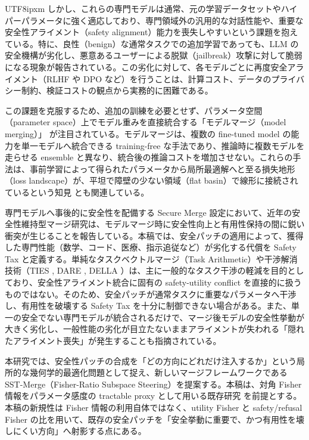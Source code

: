 \documentclass[letterpaper]{article} %
\begin{document}
\begin{CJK*}{UTF8}{ipxm}
しかし、これらの専門モデルは通常、元の学習データセットやハイパーパラメータに強く適応しており、専門領域外の汎用的な対話性能や、重要な安全性アライメント（safety alignment）能力を喪失しやすいという課題を抱えている。特に、良性（benign）な通常タスクでの追加学習であっても、LLM の安全機構が劣化し、悪意あるユーザーによる脱獄（jailbreak）攻撃に対して脆弱になる現象が報告されている\citep{zou2023universal, wei2024jailbroken, huang2024trustllm}。この劣化に対して、各モデルごとに再度安全アライメント（RLHF や DPO など）を行うことは、計算コスト、データのプライバシー制約、検証コストの観点から実務的に困難である。

この課題を克服するため、追加の訓練を必要とせず、パラメータ空間（parameter space）上でモデル重みを直接統合する「モデルマージ（model merging）」\citep{wortsman2022model, Ilharco2022EditingMW} が注目されている。モデルマージは、複数の fine-tuned model の能力を単一モデルへ統合できる training-free な手法であり、推論時に複数モデルを走らせる ensemble と異なり、統合後の推論コストを増加させない。これらの手法は、事前学習によって得られたパラメータから局所最適解へと至る損失地形（loss landscape）が、平坦で障壁の少ない領域（flat basin）で線形に接続されているという知見\citep{garipov2018surfaces, draxler2018barriers, neyshabur2020transfer, entezari2022permutation, zhou2024connectivity} とも関連している。

専門モデルへ事後的に安全性を配備する Secure Merge 設定において、近年の安全性維持型マージ研究は、モデルマージ時に安全性向上と有用性保持の間に鋭い衝突が生じることを報告している\citep{hammoud2024onebadmodel, djuhera2025safemerge, ma2025led}。本稿では、安全パッチの適用によって、獲得した専門性能（数学、コード、医療、指示追従など）が劣化する代償を Safety Tax と定義する。単純なタスクベクトルマージ（Task Arithmetic）や干渉解消技術（TIES \citep{yadav2023ties}, DARE \citep{yu2024language}, DELLA \citep{deep2024della}）は、主に一般的なタスク干渉の軽減を目的としており、安全性アライメント統合に固有の safety-utility conflict を直接的に扱うものではない。そのため、安全パッチが通常タスクに重要なパラメータへ干渉し、有用性を破壊する Safety Tax を十分に制御できない場合がある。また、単一の安全でない専門モデルが統合されるだけで、マージ後モデルの安全性挙動が大きく劣化し、一般性能の劣化が目立たないままアライメントが失われる「隠れたアライメント喪失」が発生することも指摘されている\citep{hammoud2024onebadmodel}。

本研究では、安全性パッチの合成を「どの方向にどれだけ注入するか」という局所的な幾何学的最適化問題として捉え、新しいマージフレームワークである SST-Merge（Fisher-Ratio Subspace Steering）を提案する。本稿は、対角 Fisher 情報をパラメータ感度の tractable proxy として用いる既存研究\citep{matena2022merging, tam2024geometric} を前提とする。本稿の新規性は Fisher 情報の利用自体ではなく、utility Fisher と safety/refusal Fisher の比を用いて、既存の安全パッチを「安全挙動に重要で、かつ有用性を壊しにくい方向」へ射影する点にある。


\end{CJK*}
\end{document}
